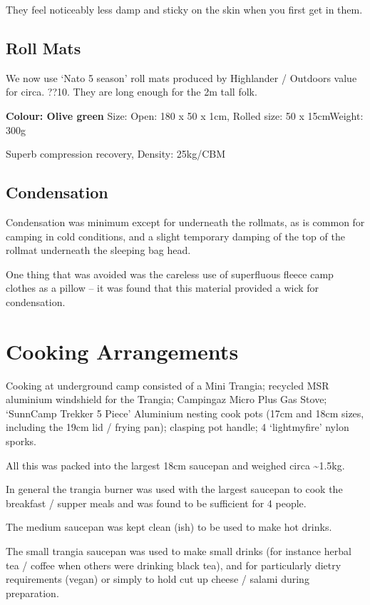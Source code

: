 They feel noticeably less damp and sticky on the skin when you first get
in them.

\subsection{Roll Mats}\label{roll-mats}

We now use `Nato 5 season' roll mats produced by Highlander / Outdoors
value for circa. ??10. They are long enough for the 2m tall folk.

\textbf{Colour: Olive green} Size: Open: 180 x 50 x 1cm, Rolled size: 50
x 15cmWeight: 300g

Superb compression recovery, Density: 25kg/CBM

\subsection{Condensation}\label{condensation}

Condensation was minimum except for underneath the rollmats, as is
common for camping in cold conditions, and a slight temporary damping of
the top of the rollmat underneath the sleeping bag head.

One thing that was avoided was the careless use of superfluous fleece
camp clothes as a pillow -- it was found that this material provided a
wick for condensation.

\section{Cooking Arrangements}\label{cooking-arrangements}

Cooking at underground camp consisted of a Mini Trangia; recycled MSR
aluminium windshield for the Trangia; Campingaz Micro Plus Gas Stove;
`SunnCamp Trekker 5 Piece' Aluminium nesting cook pots (17cm and 18cm
sizes, including the 19cm lid / frying pan); clasping pot handle; 4
`lightmyfire' nylon sporks.

All this was packed into the largest 18cm saucepan and weighed circa
\textasciitilde{}1.5kg.

In general the trangia burner was used with the largest saucepan to cook
the breakfast / supper meals and was found to be sufficient for 4
people.

The medium saucepan was kept clean (ish) to be used to make hot drinks.

The small trangia saucepan was used to make small drinks (for instance
herbal tea / coffee when others were drinking black tea), and for
particularly dietry requirements (vegan) or simply to hold cut up cheese
/ salami during preparation.

